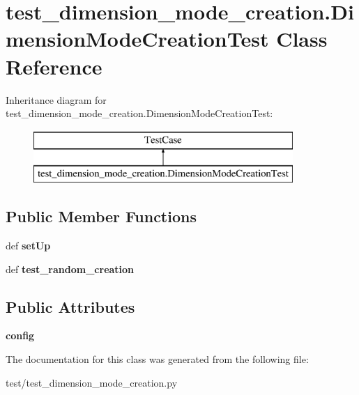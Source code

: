 \hypertarget{classtest__dimension__mode__creation_1_1_dimension_mode_creation_test}{\section{test\-\_\-dimension\-\_\-mode\-\_\-creation.\-Dimension\-Mode\-Creation\-Test Class Reference}
\label{classtest__dimension__mode__creation_1_1_dimension_mode_creation_test}
}
Inheritance diagram for test\-\_\-dimension\-\_\-mode\-\_\-creation.\-Dimension\-Mode\-Creation\-Test\-:\begin{figure}[H]
\begin{center}
\leavevmode
\includegraphics[height=2.000000cm]{classtest__dimension__mode__creation_1_1_dimension_mode_creation_test}
\end{center}
\end{figure}
\subsection*{Public Member Functions}
\begin{DoxyCompactItemize}
\item 
\hypertarget{classtest__dimension__mode__creation_1_1_dimension_mode_creation_test_a270636459480ac12e0c24524f5265e9f}{def {\bfseries set\-Up}}\label{classtest__dimension__mode__creation_1_1_dimension_mode_creation_test_a270636459480ac12e0c24524f5265e9f}

\item 
\hypertarget{classtest__dimension__mode__creation_1_1_dimension_mode_creation_test_a075d013032b40ae2e2ea654faf91f964}{def {\bfseries test\-\_\-random\-\_\-creation}}\label{classtest__dimension__mode__creation_1_1_dimension_mode_creation_test_a075d013032b40ae2e2ea654faf91f964}

\end{DoxyCompactItemize}
\subsection*{Public Attributes}
\begin{DoxyCompactItemize}
\item 
\hypertarget{classtest__dimension__mode__creation_1_1_dimension_mode_creation_test_a314058ecd7e18a734af6783a556aea9d}{{\bfseries config}}\label{classtest__dimension__mode__creation_1_1_dimension_mode_creation_test_a314058ecd7e18a734af6783a556aea9d}

\end{DoxyCompactItemize}


The documentation for this class was generated from the following file\-:\begin{DoxyCompactItemize}
\item 
test/test\-\_\-dimension\-\_\-mode\-\_\-creation.\-py\end{DoxyCompactItemize}
